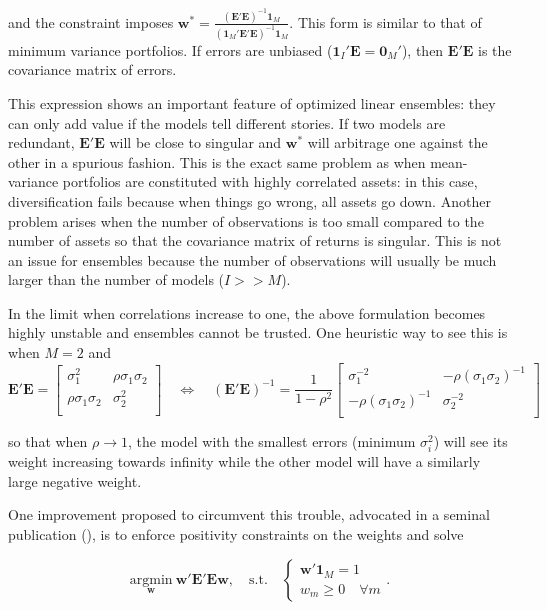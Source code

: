 \documentclass[]{krantz}
\theoremstyle{definition}
\theoremstyle{definition}
\theoremstyle{definition}
\theoremstyle{remark}
\begin{document}
and the constraint imposes
\(\textbf{w}^*=\frac{(\textbf{E}'\textbf{E})^{-1}\textbf{1}_M}{(\textbf{1}_M'\textbf{E}'\textbf{E})^{-1}\textbf{1}_M}\).
This form is similar to that of minimum variance portfolios. If errors
are unbiased (\(\textbf{1}_I'\textbf{E}=\textbf{0}_M'\)), then
\(\textbf{E}'\textbf{E}\) is the covariance matrix of errors.

This expression shows an important feature of optimized linear
ensembles: they can only add value if the models tell different stories.
If two models are redundant, \(\textbf{E}'\textbf{E}\) will be close to
singular and \(\textbf{w}^*\) will arbitrage one against the other in a
spurious fashion. This is the exact same problem as when mean-variance
portfolios are constituted with highly correlated assets: in this case,
diversification fails because when things go wrong, all assets go down.
Another problem arises when the number of observations is too small
compared to the number of assets so that the covariance matrix of
returns is singular. This is not an issue for ensembles because the
number of observations will usually be much larger than the number of
models (\(I>>M\)).

In the limit when correlations increase to one, the above formulation
becomes highly unstable and ensembles cannot be trusted. One heuristic
way to see this is when \(M=2\) and \[\textbf{E}'\textbf{E}=\left[
\begin{array}{cc} \sigma_1^2 & \rho\sigma_1\sigma_2 \\
\rho\sigma_1\sigma_2 & \sigma_2^2 \\
\end{array}
\right] \quad \Leftrightarrow  \quad 
(\textbf{E}'\textbf{E})^{-1}=\frac{1}{1-\rho^2}\left[
\begin{array}{cc} \sigma_1^{-2} & -\rho(\sigma_1\sigma_2)^{-1} \\
-\rho(\sigma_1\sigma_2)^{-1} & \sigma_2^{-2} \\
\end{array}
\right]\]

so that when \(\rho \rightarrow 1\), the model with the smallest errors
(minimum \(\sigma_i^2\)) will see its weight increasing towards infinity
while the other model will have a similarly large negative weight.

One improvement proposed to circumvent this trouble, advocated in a
seminal publication (\citet{breiman1996stacked}), is to enforce
positivity constraints on the weights and solve

\[\underset{\textbf{w}}{\text{argmin}} \ \textbf{w}'\textbf{E}'\textbf{E}\textbf{w} , \quad \text{s.t.} \quad \left\{ 
\begin{array}{l} \textbf{w}'\textbf{1}_M=1 \\ w_m \ge 0 \quad \forall m \end{array}\right. .\]
\end{document}
